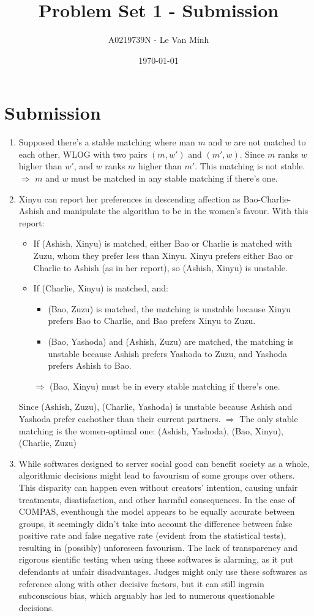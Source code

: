 \documentclass{article}
\title{Problem Set 1 - Submission}
\author{A0219739N - Le Van Minh}
\date{\today}
\begin{document}
\maketitle
\section{Submission}
\begin{enumerate}[leftmargin=\labelsep]
  \item Supposed there's a stable matching where man $m$ and $w$ are not matched to each other, WLOG with two pairs $(m, w')$ and $(m', w)$. Since $m$ ranks $w$ higher than $w'$, and $w$ ranks $m$ higher than $m'$. This matching is not stable.
    $\Rightarrow$ $m$ and $w$ must be matched in any stable matching if there's one.
  \item Xinyu can report her preferences in descending affection as Bao-Charlie-Ashish and manipulate the algorithm to be in the women's favour. With this report:
    \begin{itemize}
      \item If (Ashish, Xinyu) is matched, either Bao or Charlie is matched with Zuzu, whom they prefer less than Xinyu. Xinyu prefers either Bao or Charlie to Ashish (as in her report), so (Ashish, Xinyu) is unstable.
      \item If (Charlie, Xinyu) is matched, and:
        \begin{itemize}
          \item (Bao, Zuzu) is matched, the matching is unstable because Xinyu prefers Bao to Charlie, and Bao prefers Xinyu to Zuzu.
          \item (Bao, Yashoda) and (Ashish, Zuzu) are matched, the matching is unstable because Ashish prefers Yashoda to Zuzu, and Yashoda prefers Ashish to Bao.
        \end{itemize}
      $\Rightarrow$ (Bao, Xinyu) must be in every stable matching if there's one.
    \end{itemize}
    Since {(Ashish, Zuzu), (Charlie, Yashoda)} is unstable because Ashish and Yashoda prefer eachother than their current partners.
    $\Rightarrow$ The only stable matching is the women-optimal one: (Ashish, Yashoda), (Bao, Xinyu), (Charlie, Zuzu)
  \item While softwares designed to server social good can benefit society as a whole, algorithmic decisions might lead to favourism of some groups over others. This disparity can happen even without creators' intention, causing unfair treatments, disatisfaction, and other harmful consequences. In the case of COMPAS, eventhough the model appears to be equally accurate between groups, it seemingly didn't take into account the difference between false positive rate and false negative rate (evident from the statistical tests), resulting in (possibly) unforeseen favourism. The lack of transparency and rigorous sientific testing when using these softwares is alarming, as it put defendants at unfair disadvantages. Judges might only use these softwares as reference along with other decisive factors, but it can still ingrain subconscious bias, which arguably has led to numerous questionable decisions.
\end{enumerate}
\end{document}
